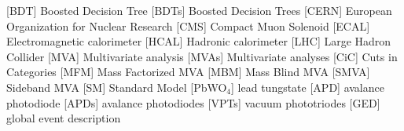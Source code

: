 \begin{acronym}[AAAAAA]
 [BDT] {Boosted Decision Tree}
 [BDTs] {Boosted Decision Trees}
 [CERN] {European Organization for Nuclear Research}
 [CMS] {Compact Muon Solenoid}
 [ECAL] {Electromagnetic calorimeter}
 [HCAL] {Hadronic calorimeter}
 [LHC] {Large Hadron Collider}
 [MVA] {Multivariate analysis}
 [MVAs] {Multivariate analyses}
 [CiC] {Cuts in Categories}
 [MFM] {Mass Factorized MVA}
 [MBM] {Mass Blind MVA}
 [SMVA] {Sideband MVA}
 [SM] {Standard Model}
 [PbWO$_{4}$] {lead tungstate}
 [APD] {avalance photodiode}
 [APDs] {avalance photodiodes}
 [VPTs] {vacuum phototriodes}
 [GED] {global event description}
\end{acronym}



